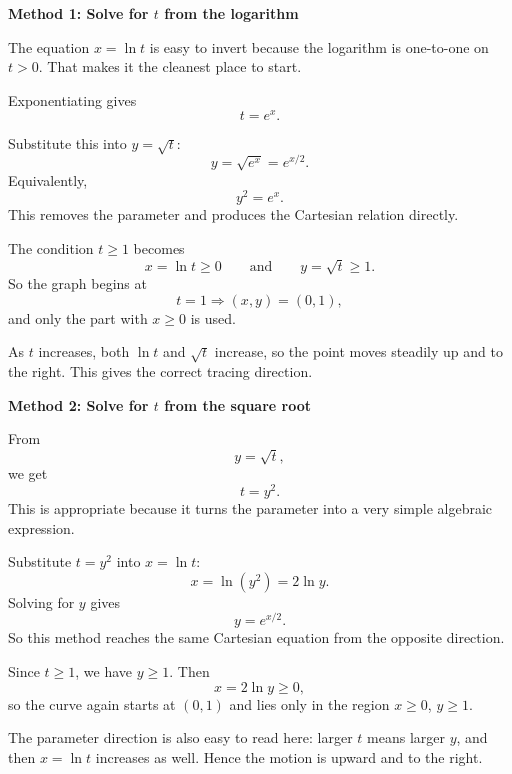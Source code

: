 \documentclass[a4paper,12pt,twocolumn]{article}
\newenvironment{solutionbox}{\begin{framed}}{\end{framed}}
\begin{document}
\begin{solutionbox}
\textbf{Method 1: Solve for \(t\) from the logarithm}

\begin{steps}
\item The equation \(x=\ln t\) is easy to invert because the logarithm is one-to-one on \(t>0\). That makes it the cleanest place to start.

Exponentiating gives
\[
t=e^x.
\]

\item Substitute this into \(y=\sqrt{t}\):
\[
y=\sqrt{e^x}=e^{x/2}.
\]
Equivalently,
\[
y^2=e^x.
\]
This removes the parameter and produces the Cartesian relation directly.

\item The condition \(t\ge 1\) becomes
\[
x=\ln t\ge 0
\qquad\text{and}\qquad
y=\sqrt{t}\ge 1.
\]
So the graph begins at
\[
t=1 \Longrightarrow (x,y)=(0,1),
\]
and only the part with \(x\ge 0\) is used.

\item As \(t\) increases, both \(\ln t\) and \(\sqrt t\) increase, so the point moves steadily up and to the right. This gives the correct tracing direction.
\end{steps}
\end{solutionbox}

\begin{solutionbox}
\textbf{Method 2: Solve for \(t\) from the square root}

\begin{steps}
\item From
\[
y=\sqrt t,
\]
we get
\[
t=y^2.
\]
This is appropriate because it turns the parameter into a very simple algebraic expression.

\item Substitute \(t=y^2\) into \(x=\ln t\):
\[
x=\ln(y^2)=2\ln y.
\]
Solving for \(y\) gives
\[
y=e^{x/2}.
\]
So this method reaches the same Cartesian equation from the opposite direction.

\item Since \(t\ge 1\), we have \(y\ge 1\). Then
\[
x=2\ln y\ge 0,
\]
so the curve again starts at \((0,1)\) and lies only in the region \(x\ge 0\), \(y\ge 1\).

\item The parameter direction is also easy to read here: larger \(t\) means larger \(y\), and then \(x=\ln t\) increases as well. Hence the motion is upward and to the right.
\end{steps}
\end{solutionbox}
\end{document}
